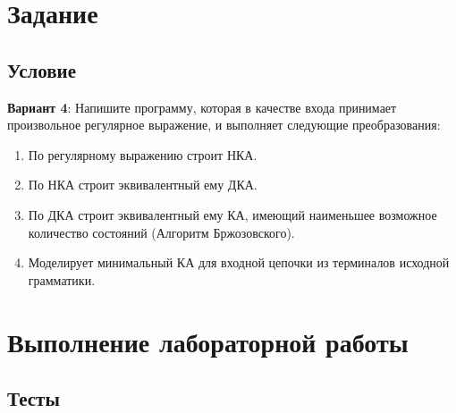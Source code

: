 \chapter{Задание}

\section{Условие}

\textbf{Вариант 4}: Напишите программу, которая в качестве входа принимает произвольное регулярное выражение, и выполняет следующие преобразования:
\begin{enumerate}
    \item По регулярному выражению строит НКА.
    \item По НКА строит эквивалентный ему ДКА.
    \item По ДКА строит эквивалентный ему КА, имеющий наименьшее возможное количество состояний (Алгоритм Бржозовского).
    \item Моделирует минимальный КА для входной цепочки из терминалов исходной грамматики.
\end{enumerate}


\chapter{Выполнение лабораторной работы}

\section{Тесты}

